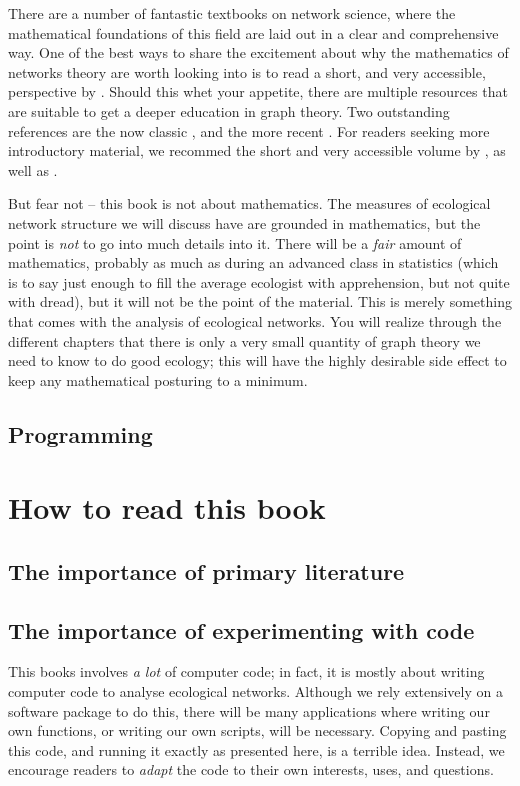 There are a number of fantastic textbooks on network science, where the
mathematical foundations of this field are laid out in a clear and comprehensive
way. One of the best ways to share the excitement about why the mathematics of
networks theory are worth looking into is to read a short, and very accessible,
perspective by \textcite{Str01}. Should this whet your appetite, there are
multiple resources that are suitable to get a deeper education in graph theory.
Two outstanding references are the now classic \textcite{New10}, and the more
recent \textcite{Bar16}. For readers seeking more introductory material, we
recommed the short and very accessible volume by \textcite{Cha85}, as well as
\textcite{Wes01}.

But fear not -- this book is not about mathematics. The measures of ecological
network structure we will discuss have are grounded in mathematics, but the
point is \emph{not} to go into much details into it. There will be a \emph{fair}
amount of mathematics, probably as much as during an advanced class in
statistics (which is to say just enough to fill the average ecologist with
apprehension, but not quite with dread), but it will not be the point of the
material. This is merely something that comes with the analysis of ecological
networks. You will realize through the different chapters that there is only a
very small quantity of graph theory we need to know to do good ecology; this
will have the highly desirable side effect to keep any mathematical posturing to
a minimum.

\subsection{Programming}

\section{How to read this book}

\subsection{The importance of primary literature}

\subsection{The importance of experimenting with code}

This books involves \emph{a lot} of computer code; in fact, it is mostly about
writing computer code to analyse ecological networks. Although we rely
extensively on a software package \parencite{PoiBelHoe19} to do this, there will
be many applications where writing our own functions, or writing our own
scripts, will be necessary. Copying and pasting this code, and running it
exactly as presented here, is a terrible idea. Instead, we encourage readers to
\emph{adapt} the code to their own interests, uses, and questions.

